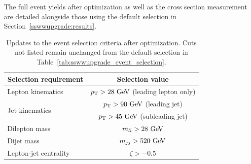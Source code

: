 The full event yields after optimization as well as the cross section measurement are detailed alongside those using the default selection in Section~\ref{sswwupgrade:results}.

\begin{table}[htb]
  \centering
  \begin{tabular}{l|c}
    Selection requirement              & Selection value \\
    \hline\hline
    Lepton kinematics                  & $\pt > 28\gev$ (leading lepton only) \\
    \multirow{2}{*}{Jet kinematics}    & $\pt > 90\gev$ (leading jet) \\
                                       & $\pt > 45\gev$ (subleading jet) \\
    \hline
    Dilepton mass                      & $m_{ll} > 28\gev$ \\
    Dijet mass                         & $m_{jj} > 520\gev$ \\
    Lepton-jet centrality              & $\zeta > -0.5$ \\
    \hline
  \end{tabular}
  \caption{Updates to the \ssww event selection criteria after optimization.  Cuts not listed remain unchanged from the default selection in Table~\ref{tab:sswwupgrade_event_selection}.}
  \label{tab:sswwupgrade_optimized_selection}
\end{table}

